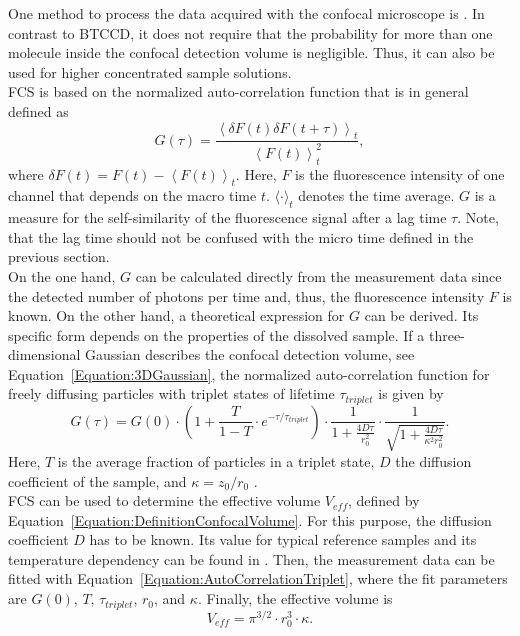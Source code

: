 One method to process the data acquired with the confocal microscope is . In contrast to \gls{BTCCD}, it does not require that the probability for more than one molecule inside the confocal detection volume is negligible. Thus, it can also be used for higher concentrated sample solutions.\\

\gls{FCS} is based on the normalized auto-correlation function that is in general defined as
\begin{equation}
	G(\tau) = \frac{\left\langle \delta F(t) \delta F(t + \tau) \right\rangle_t}{\left\langle F(t) \right\rangle_t^2},
\end{equation}
where $\delta F(t) = F(t) - \left\langle F(t) \right\rangle_t$. Here, $F$ is the fluorescence intensity of one channel that depends on the macro time $t$. $\langle \cdot \rangle_t$ denotes the time average. $G$ is a measure for the self-similarity of the fluorescence signal after a lag time $\tau$. Note, that the lag time should not be confused with the micro time defined in the previous section.\\

On the one hand, $G$ can be calculated directly from the measurement data since the detected number of photons per time and, thus, the fluorescence intensity $F$ is known. On the other hand, a theoretical expression for $G$ can be derived. Its specific form depends on the properties of the dissolved sample. If  a three-dimensional Gaussian describes the confocal detection volume, see Equation~\eqref{Equation:3DGaussian}, the normalized auto-correlation function for freely diffusing particles with triplet states of lifetime $\tau_{triplet}$ is given by
\begin{equation} \label{Equation:AutoCorrelationTriplet}
	G(\tau) = G(0) \cdot \left(1 + \frac{T}{1 - T} \cdot e^{-\tau/ \tau_{triplet}} \right) \cdot \frac{1}{1 + \frac{4D\tau}{r_0^2}} \cdot \frac{1}{\sqrt{1 + \frac{4D\tau}{\kappa^2r_0^2}}}.
\end{equation}
Here, $T$ is the average fraction of particles in a triplet state, $D$ the diffusion coefficient of the sample, and $\kappa = z_0/ r_0$ \cite{Schwille2001}.\\ 

\gls{FCS} can be used to determine the effective volume $V_{eff}$, defined by Equation~\eqref{Equation:DefinitionConfocalVolume}. For this purpose, the diffusion coefficient $D$ has to be known. Its value for typical reference samples and its temperature dependency can be found in \cite{Kapusta2010}. Then, the measurement data can be fitted with Equation~\eqref{Equation:AutoCorrelationTriplet}, where the fit parameters are $G(0)$, $T$, $\tau_{triplet}$, $r_0$, and $\kappa$. Finally, the effective volume is \cite{ConfocalVolumeDetermination} 
\begin{equation}
	V_{eff} = \pi^{3/2} \cdot r_0^3 \cdot \kappa.
\end{equation}\\

